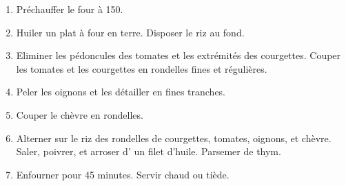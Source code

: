 
\begin{ingredients}
\end{ingredients}


\begin{recipe}
  \begin{enumerate}

  \item Pr\'echauffer le four \`a 150\C.

  \item Huiler un plat \`a four en terre.  Disposer le riz au fond.

  \item Eliminer les p\'edoncules des tomates et les extr\'emit\'es
    des courgettes.  Couper  les tomates et les courgettes en
    rondelles fines et r\'eguli\`eres.

  \item Peler les oignons et les d\'etailler en fines tranches.

  \item Couper le ch\`evre en rondelles.

  \item Alterner sur le riz des rondelles de courgettes, tomates,
    oignons, et ch\`evre.  Saler, poivrer, et arroser d' un filet
    d'huile.  Parsemer de thym.

  \item Enfourner pour 45 minutes.  Servir chaud ou ti\`ede.

  \end{enumerate}
\end{recipe}
